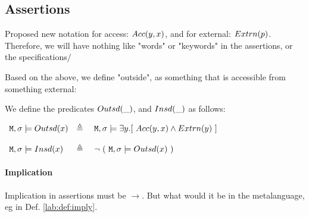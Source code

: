 \subsection{Assertions}

Proposed new notation for access: $Acc(y,x)$, and for external: $Extrn(p)$. Therefore, we will have nothing like "words" or "keywords" in the assertions, or the specifications/

Based on the above, we define "outside", as something that is accessible from something external:

\begin{definition}

We define the predicates $Outsd(\_)$, and $Insd(\_)$ as follows:

$\begin{array}{lll}
   \Mod, \sigma \models \outside{x} & \triangleq & \ \Mod, \sigma \models \exists y.[ \ \access{y} {x} \wedge \external {y}  \ ] 
  ~ \\
   \\
      \Mod, \sigma \models \inside{x} & \triangleq & \ \neg \ (\  \Mod, \sigma \models \outside{x}  \ )
  \end{array}
$

\end{definition}



\paragraph{Implication}

Implication in assertions must be $\longrightarrow$. But what would it be in the metalanguage, eg in Def. \ref{lab:def:imply}.
